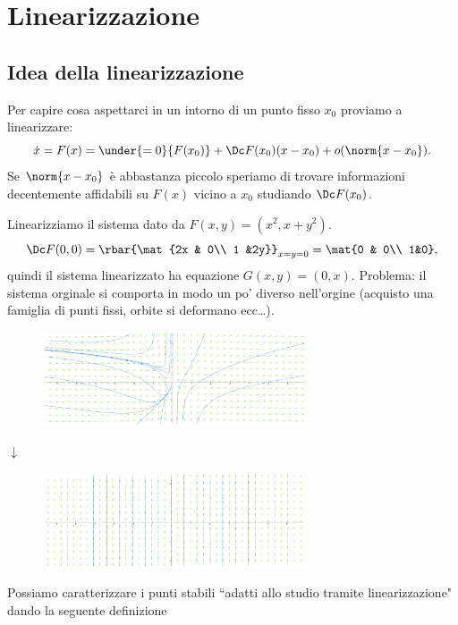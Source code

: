 \chapter{Linearizzazione}
\section{Idea della linearizzazione}
Per capire cosa aspettarci in un intorno di un punto fisso $x_0$ proviamo a linearizzare:
\[\dot x=F(x)=\under{=0}{F(x_0)}+\Dc F(x_0)(x-x_0)+o(\norm{x-x_0}).\]
Se $\norm{x-x_0}$ \`e abbastanza piccolo speriamo di trovare informazioni decentemente affidabili su $F(x)$ vicino a $x_0$ studiando $\Dc F(x_0)$.
\begin{example}
Linearizziamo il sistema dato da $F(x,y)=(x^2,x+y^2)$.
\[\Dc F(0,0)=\rbar{\mat{2x & 0\\ 1 &2y}}_{x=y=0}=\mat{0 & 0\\ 1&0},\]
quindi il sistema linearizzato ha equazione $G(x,y)=(0,x)$.
Problema: il sistema orginale si comporta in modo un po' diverso nell'orgine (acquisto una famiglia di punti fissi, orbite si deformano ecc\dots).
\begin{center}
    \begin{figure}[!htb]
        \centering
        \includegraphics[height=2.8cm]{Immagini/fallita_linearizzazione.pdf}
    \end{figure}
    $\downarrow$
    \begin{figure}[!htb]
        \centering
        \includegraphics[height=2.8cm]{Immagini/fallita_linearizzazione_linearizzato.pdf}
    \end{figure}
\end{center}



\end{example}

\noindent Possiamo caratterizzare i punti stabili ``adatti allo studio tramite linearizzazione" dando la seguente definizione

